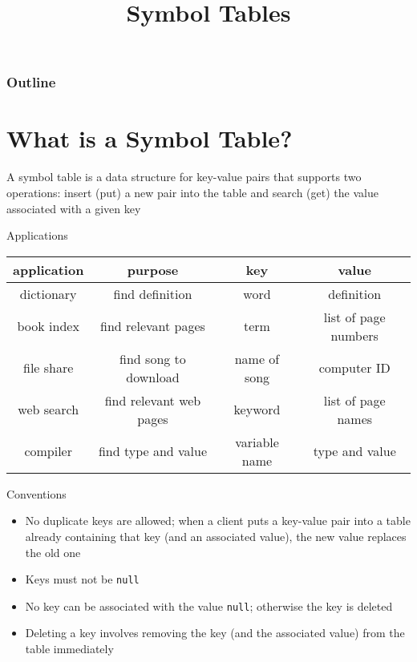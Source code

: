 \documentclass[8pt,a4paper,compress]{beamer}
\title{Symbol Tables}
\date{}
\begin{document}
\begin{frame}
\vfill
\titlepage
\end{frame}

\begin{frame}
\frametitle{Outline}
\tableofcontents
\end{frame}

\section{What is a Symbol Table?}
\begin{frame}[fragile]
\pause

A symbol table is a data structure for key-value pairs that supports two operations: insert (put) a new pair into the table and search (get) the value associated with a given key

\pause
\bigskip

Applications 
\begin{center}
\begin{tabular}{cccc}
application & purpose & key & value \\ \hline
dictionary & find definition & word & definition \\
book index & find relevant pages & term & list of page numbers \\
file share & find song to download & name of song & computer ID \\
web search & find relevant web pages & keyword & list of page names \\
compiler & find type and value & variable name & type and value \\
\end{tabular} 
\end{center}
\end{frame}

\begin{frame}[fragile]
\pause

Conventions
\begin{itemize}
\item No duplicate keys are allowed; when a client puts a key-value pair into a table already containing that key (and an associated value), the new value replaces the old one

\item Keys must not be \lstinline{null}

\item No key can be associated with the value \lstinline{null}; otherwise the key is deleted

\item Deleting a key involves removing the key (and the associated value) from the table immediately
\end{itemize}
\end{frame}
\end{document}
